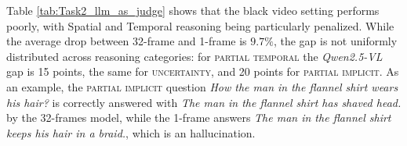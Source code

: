 Table \ref{tab:Task2_llm_as_judge} shows that the black video  setting performs  poorly, with  Spatial and Temporal reasoning being particularly penalized.  While the average drop between 32-frame and 1-frame is $9.7\%$, the gap is not uniformly distributed across  reasoning categories: for  \textsc{partial temporal} the \textit{Qwen2.5-VL} gap is 15  points, the same for \textsc{uncertainty}, and 20 points for \textsc{partial implicit}. As an example, the  \textsc{partial implicit} question \textit{How the man in the flannel shirt wears his hair?} is correctly answered with
 \textit{The man in the flannel shirt has shaved head.} by the 32-frames model, while the 
1-frame  answers \textit{The man in the flannel shirt keeps his hair in a braid.}, which is an  hallucination.

\begin{table}[t!]
  \centering
  \caption{{\label{tab:similarity_metrics_vqa}}VLM performance for open-ended VQA (Task 2) according to similarity-based metrics.}
  

\end{table}

